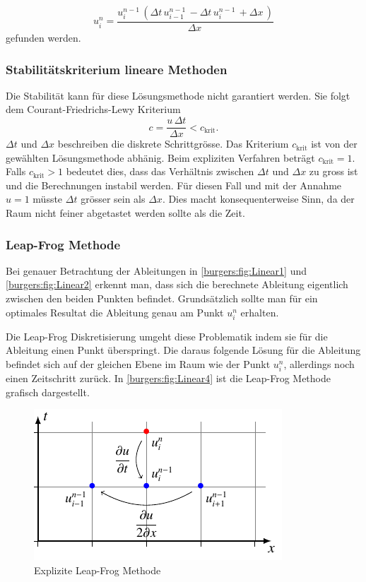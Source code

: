 	\begin{equation}
		u_{i}^{n} = \frac{u^{n-1}_{i}\, \left(\Delta{t}\, u^{n-1}_{i-1}\, - \Delta{t}\, u^{n-1}_{i}\, + \Delta{x}\,\right)}{\Delta{x}\,}
    	\label{burgers:eq_ex_sol_lin2}
	\end{equation}
gefunden werden.

\subsubsection{Stabilit\"atskriterium lineare Methoden}
	Die Stabilit\"at kann f\"ur diese L\"osungsmethode nicht garantiert werden.
	Sie folgt dem Courant-Friedrichs-Lewy Kriterium
	\begin{equation}
		  c = \frac{u \, \Delta t}{\Delta x} < c_{\text{krit}}.
	\end{equation}
	$ \Delta t$ und $\Delta x$  beschreiben die diskrete Schrittgr\"osse.
	Das Kriterium $c_{\text{krit}}$ ist von der gew\"ahlten L\"osungsmethode abh\"anig.
	Beim expliziten Verfahren beträgt $c_{\text{krit}} = 1$.
	Falls $c_{\text{krit}} > 1$ bedeutet dies, dass das Verh\"altnis zwischen $ \Delta t$ und $\Delta x$ zu gross ist und die Berechnungen instabil werden.
	F\"ur diesen Fall und mit der Annahme $u = 1$ m\"usste $ \Delta t$ gr\"osser sein als $\Delta x$.
	Dies macht konsequenterweise Sinn, da der Raum nicht feiner abgetastet werden sollte als die Zeit.



\subsubsection{Leap-Frog Methode}

	Bei genauer Betrachtung der Ableitungen in \autoref{burgers:fig:Linear1} und \autoref{burgers:fig:Linear2} erkennt man, dass sich die berechnete Ableitung eigentlich zwischen den beiden Punkten befindet.
	Grunds\"atzlich sollte man für ein optimales Resultat die Ableitung genau am Punkt $u_{i}^{n}$ erhalten.

	\medskip
	Die Leap-Frog Diskretisierung umgeht diese Problematik indem sie f\"ur die Ableitung einen Punkt \"uberspringt.
	Die daraus folgende L\"osung für die Ableitung befindet sich auf der gleichen Ebene im Raum wie der Punkt $u_{i}^{n}$, allerdings noch einen Zeitschritt zurück.
	In \autoref{burgers:fig:Linear4} ist die Leap-Frog Methode grafisch dargestellt.

	     \begin{figure}
		\centering
		\includegraphics[height=.4\textwidth]{papers/burgers/BurgersEquation/tikz/linear4/linear4.pdf}
		\caption{Explizite Leap-Frog Methode}
		\label{burgers:fig:Linear4}
		\end{figure}

